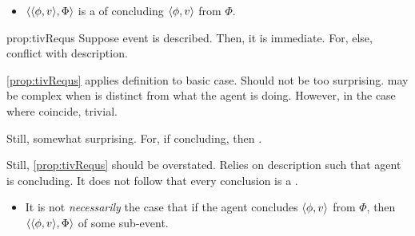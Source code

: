 \begin{note}
  \begin{proposition}
    \label{prop:tivRequs}
    \begin{itemize}
    \item
      \(\langle \langle \phi, v \rangle, \Phi \rangle\) is a \requ{} of concluding \(\langle \phi, v \rangle\) from \(\Phi\).
    \end{itemize}
  \end{proposition}

  \begin{argument}{prop:tivRequs}
    Suppose event is described.
    Then, it is immediate.
    For, else, conflict with description.
  \end{argument}

  \autoref{prop:tivRequs} applies definition to basic case.
  Should not be too surprising.
   may be complex when \requ{} is distinct from what the agent is doing.
  However, in the case where coincide, trivial.

  Still, somewhat surprising.
  For, if concluding, then .

  Still, \autoref{prop:tivRequs} should be overstated.
  Relies on description such that agent is concluding.
  It does not follow that every conclusion is a \fc{}.

  \begin{proposition}
    \label{prop:requ-not-refl}

    \begin{itemize}
    \item
      It is not \emph{necessarily} the case that if the agent concludes \(\langle \phi, v \rangle\) from \(\Phi\), then \(\langle \langle \phi, v \rangle, \Phi \rangle\) \requ{} of some sub-event.
    \end{itemize}
    \vspace{-\baselineskip}
  \end{proposition}


\end{note}
